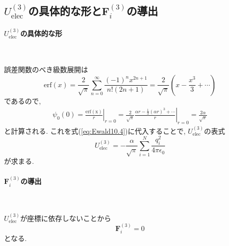 \subsection{$U_{\mathrm{elec}}^{(3)}$の具体的な形と$\bm{F}_{i}^{(3)}$の導出}
\paragraph{$U_{\mathrm{elec}}^{(3)}$の具体的な形} \

誤差関数のべき級数展開は
\begin{equation}
    \mathrm{erf}(x)
  =
    \frac{2}{\sqrt{\pi}} \sum_{n=0}^{\infty}
    \frac{(-1)^{n} x^{2n+1}}{n! (2n+1)}
  =
    \frac{2}{\sqrt{\pi}}\left( x - \frac{x^{3}}{3} + \cdots\right)
 \label{eq:Ewald33}
\end{equation}
であるので,
\begin{align}
   \psi_{0}(0)
 =
   \left.\frac{\mathrm{erf(x)}}{r} \right|_{r=0}
 =
   \left.\frac{2}{\sqrt{\pi}} \frac{\alpha r - \frac{1}{3}(\alpha r)^{3} + \cdots}{r} \right|_{r=0}
 =
   \frac{2 \alpha}{\sqrt{\pi}}
 \label{eq:Ewald34}
\end{align}
と計算される. これを式(\ref{eq:Ewald10.4})に代入することで, $U_{\mathrm{elec}}^{(3)}$の表式
\begin{equation}
    U_{\mathrm{elec}}^{(3)}
  =
   -\frac{\alpha}{\sqrt{\pi}} \sum_{i=1}^{N} \frac{q_{i}^{2}}{4 \pi \epsilon_{0}}
 \label{eq:Ewald35}
\end{equation}
が求まる.

\paragraph{$\bm{F}_{i}^{(3)}$の導出} \

$U_{\mathrm{elec}}^{(3)}$が座標に依存しないことから
\begin{equation}
 \bm{F}_{i}^{(3)} = 0
\end{equation}
となる.


